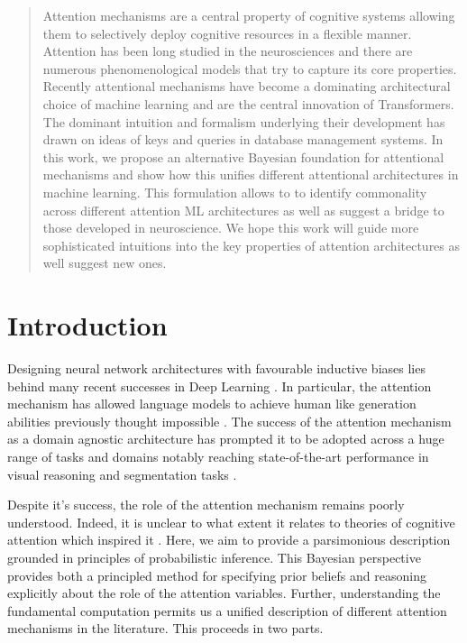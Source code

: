 \documentclass{article}
\theoremstyle{plain}
\theoremstyle{definition}
\theoremstyle{remark}
\begin{document}
\printAffiliationsAndNotice{}  %

\begin{abstract}
Attention mechanisms are a central property of cognitive systems allowing them to selectively deploy cognitive resources in a flexible manner.   Attention has been long studied in the neurosciences and there are numerous phenomenological models that try to capture its core properties.  Recently attentional mechanisms have become a dominating architectural choice of machine learning and are the central innovation of Transformers.  The dominant intuition and formalism underlying their development has drawn on ideas of keys and queries in database management systems.  In this work, we propose an alternative Bayesian foundation for attentional mechanisms and show how this unifies different attentional architectures in machine learning. This formulation allows to to identify commonality across different attention ML architectures as well as suggest a bridge to those developed in neuroscience. 
We hope this work will guide more sophisticated intuitions into the key properties of attention architectures as well suggest new ones. 
\end{abstract}

\section{Introduction}

Designing neural network architectures with favourable inductive biases lies behind many recent successes in Deep Learning \cite{baxter_model_2000}. In particular, the attention mechanism has  allowed language models to achieve human like generation abilities previously thought impossible \cite{vaswani_attention_2017}. The success of the attention mechanism as a domain agnostic architecture has prompted it to be adopted across a huge range of tasks and domains notably reaching state-of-the-art performance in visual reasoning and segmentation tasks \cite{dosovitskiy_image_2021, wang_image_2022}. 

Despite it's success, the role of the attention mechanism remains poorly understood. Indeed, it is unclear to what extent it relates to theories of cognitive attention which inspired it \cite{lindsay_attention_2020}. Here, we aim to provide a parsimonious description grounded in principles of probabilistic inference. This Bayesian perspective provides both a principled method for specifying prior beliefs and reasoning explicitly about the role of the attention variables. Further, understanding the fundamental computation permits us a unified description of different attention mechanisms in the literature. This proceeds in two parts.
\end{document}
